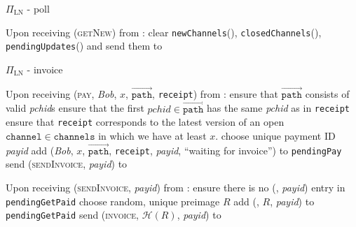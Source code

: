 \begin{protocolbox}{$\Pi_{\mathrm{LN}}$ - poll}
\begin{algorithmic}[1]
    \State Upon receiving (\textsc{getNew}) from \alice:
    \Indent
      \State clear \texttt{newChannels}(\alice),
      \texttt{closedChannels}(\alice), \texttt{pendingUpdates}(\alice) and send
      them to \alice
    \EndIndent
  \end{algorithmic}
\end{protocolbox}

\begin{protocolbox}{$\Pi_{\mathrm{LN}}$ - invoice}
  \label{alg:protocol:pay:invoice}
  \begin{algorithmic}[1]
    \State Upon receiving (\textsc{pay}, \textit{Bob}, $x$,
    $\overrightarrow{\mathtt{path}}$, \texttt{receipt}) from \environment:
    \Indent
      \State ensure that $\overrightarrow{\mathtt{path}}$ consists of valid
      \textit{pchid}s
      \State ensure that the first $\mathit{pchid} \in
      \overrightarrow{\mathtt{path}}$ has the same \textit{pchid} as in
      \texttt{receipt}
      \State ensure that \texttt{receipt} corresponds to the latest version of
      an open $\mathtt{channel} \in \mathtt{channels}$ in which we have at least
      $x$.
      \State choose unique payment ID \textit{payid} 
      \State add (\textit{Bob}, $x$, $\overrightarrow{\mathtt{path}}$,
      \texttt{receipt}, \textit{payid}, ``waiting for invoice'') to
      \texttt{pendingPay}
      \State send (\textsc{sendInvoice}, \textit{payid}) to \bob{}
    \EndIndent
    \State

    \State Upon receiving (\textsc{sendInvoice}, \textit{payid}) from \bob:
    \Indent
      \State ensure there is no (\bob, \textit{payid}) entry in
      \texttt{pendingGetPaid}
      \State choose random, unique preimage $R$
      \State add (\bob, $R$, \textit{payid}) to \texttt{pendingGetPaid}
      \State send (\textsc{invoice}, $\mathcal{H}\left(R\right)$,
      \textit{payid}) to \bob{}
    \EndIndent
    \State


\end{algorithmic}
\end{protocolbox}
